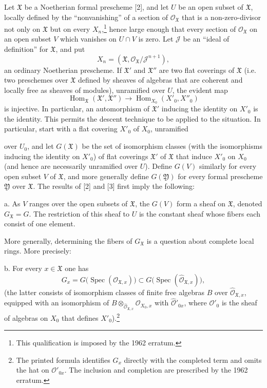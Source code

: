 Let $\mathfrak X$ be a Noetherian formal prescheme [2], and let $U$ be an open
subset of $\mathfrak X$, locally defined by the “nonvanishing” of a section of
$\mathcal O_{\mathfrak X}$ that is a non-zero-divisor not only on
$\mathfrak X$ but on every $X_n$,\footnote{This qualification is imposed by
the 1962 erratum.} hence large enough that every section of
$\mathcal O_{\mathfrak X}$ on an open subset $V$ which vanishes on $U\cap V$
is zero. Let $\mathcal J$ be an “ideal of definition” for $\mathfrak X$, and
put
\[
  X_n=(\mathfrak X,\mathcal O_{\mathfrak X}/\mathcal J^{n+1}),
\]
an ordinary Noetherian prescheme. If $\mathfrak X'$ and $\mathfrak X''$ are
two flat coverings of $\mathfrak X$ (i.e. two preschemes over $\mathfrak X$
defined by sheaves of algebras that are coherent and locally free as sheaves of
modules), unramified over $U$, the evident map
\[
  \operatorname{Hom}_{\mathfrak X}(\mathfrak X',\mathfrak X'')
  \longrightarrow
  \operatorname{Hom}_{X_0}(X'_0,X''_0)
\]
is injective. In particular, an automorphism of $\mathfrak X'$ inducing the
identity on $X'_0$ is the identity. This permits the descent technique to be
applied to the situation. In particular, start with a flat covering $X'_0$ of
$X_0$, unramified

over $U_0$, and let $G(\mathfrak X)$ be the set of isomorphism classes (with
the isomorphisms inducing the identity on $X'_0$) of flat coverings
$\mathfrak X'$ of $\mathfrak X$ that induce $X'_0$ on $X_0$ (and hence are
necessarily unramified over $U$). Define $G(V)$ similarly for every open subset
$V$ of $\mathfrak X$, and more generally define $G(\mathfrak Y)$ for every
formal prescheme $\mathfrak Y$ over $\mathfrak X$. The results of [2] and [3]
first imply the following:

\noindent a. As $V$ ranges over the open subsets of $\mathfrak X$, the $G(V)$
form a sheaf on $\mathfrak X$, denoted $G_{\mathfrak X}=G$. The restriction of
this sheaf to $U$ is the constant sheaf whose fibers each consist of one
element.

More generally, determining the fibers of $G_{\mathfrak X}$ is a question
about complete local rings. More precisely:

\noindent b. For every $x\in\mathfrak X$ one has
\[
  G_x=G\bigl(\operatorname{Spec}(\mathcal O_{\mathfrak X,x})\bigr)
  \subset
  G\bigl(\operatorname{Spec}(\widehat{\mathcal O}_{\mathfrak X,x})\bigr),
\]
(the latter consists of isomorphism classes of finite free algebras $B$ over
$\widehat{\mathcal O}_{\mathfrak X,x}$, equipped with an isomorphism of
$B\otimes_{\widehat{\mathcal O}_{\mathfrak X,x}}\mathcal O_{X_0,x}$ with
$\widehat{\mathcal O}'_{0x}$, where $\mathcal O'_0$ is the sheaf of algebras on
$X_0$ that defines $X'_0$).\footnote{The printed formula identifies $G_x$
directly with the completed term and omits the hat on
$\mathcal O'_{0x}$. The inclusion and completion are prescribed by the 1962
erratum.}

